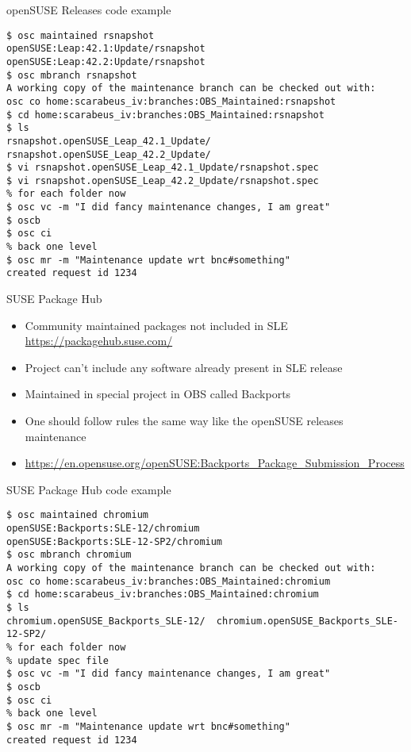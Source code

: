 \documentclass{beamer}
\begin{document}
\begin{frame}[fragile]{openSUSE Releases code example}
	\begin{tiny}
	\begin{verbatim}
$ osc maintained rsnapshot
openSUSE:Leap:42.1:Update/rsnapshot
openSUSE:Leap:42.2:Update/rsnapshot
$ osc mbranch rsnapshot
A working copy of the maintenance branch can be checked out with:
osc co home:scarabeus_iv:branches:OBS_Maintained:rsnapshot
$ cd home:scarabeus_iv:branches:OBS_Maintained:rsnapshot
$ ls
rsnapshot.openSUSE_Leap_42.1_Update/  rsnapshot.openSUSE_Leap_42.2_Update/
$ vi rsnapshot.openSUSE_Leap_42.1_Update/rsnapshot.spec
$ vi rsnapshot.openSUSE_Leap_42.2_Update/rsnapshot.spec
% for each folder now
$ osc vc -m "I did fancy maintenance changes, I am great"
$ oscb
$ osc ci
% back one level
$ osc mr -m "Maintenance update wrt bnc#something"
created request id 1234
	\end{verbatim}
	\end{tiny}
\end{frame}

\begin{frame}[t]{SUSE Package Hub}
	\begin{itemize}
	\item Community maintained packages not included in SLE \url{https://packagehub.suse.com/}
	\item Project can't include any software already present in SLE release
	\item Maintained in special project in OBS called Backports
	\item One should follow rules the same way like the openSUSE releases maintenance
	\item \url{https://en.opensuse.org/openSUSE:Backports_Package_Submission_Process}
	\end{itemize}
\end{frame}

\begin{frame}[fragile]{SUSE Package Hub code example}
	\begin{tiny}
	\begin{verbatim}
$ osc maintained chromium
openSUSE:Backports:SLE-12/chromium
openSUSE:Backports:SLE-12-SP2/chromium
$ osc mbranch chromium
A working copy of the maintenance branch can be checked out with:
osc co home:scarabeus_iv:branches:OBS_Maintained:chromium
$ cd home:scarabeus_iv:branches:OBS_Maintained:chromium
$ ls
chromium.openSUSE_Backports_SLE-12/  chromium.openSUSE_Backports_SLE-12-SP2/
% for each folder now
% update spec file
$ osc vc -m "I did fancy maintenance changes, I am great"
$ oscb
$ osc ci
% back one level
$ osc mr -m "Maintenance update wrt bnc#something"
created request id 1234
	\end{verbatim}
	\end{tiny}
\end{frame}
\end{document}
